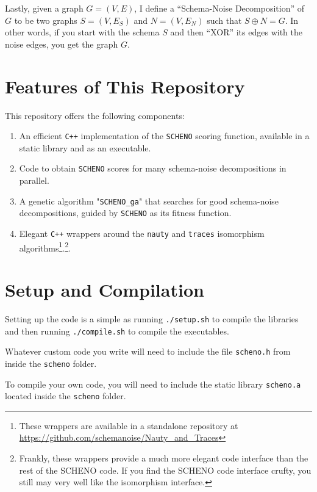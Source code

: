 \documentclass{article}
\begin{document}
Lastly, given a graph $G = (V, E)$, I define a ``Schema-Noise Decomposition'' of $G$ to be two graphs $S = (V, E_S)$ and $N = (V, E_N)$ such that $S \oplus N = G$. In other words, if you start with the schema $S$ and then ``XOR'' its edges with the noise edges, you get the graph $G$.


\section{Features of This Repository}\label{sec:features}

This repository offers the following components:

\begin{enumerate}
    \item An efficient \verb|C++| implementation of the \verb|SCHENO| scoring function, available in a static library and as an executable.
    \item Code to obtain \verb|SCHENO| scores for many schema-noise decompositions in parallel.
    \item A genetic algorithm "\verb|SCHENO_ga|" that searches for good schema-noise decompositions, guided by \verb|SCHENO| as its fitness function.
    \item Elegant \verb|C++| wrappers around the \verb|nauty| and \verb|traces| isomorphism algorithms\footnote{These wrappers are available in a standalone repository at \url{https://github.com/schemanoise/Nauty_and_Traces}}.\footnote{Frankly, these wrappers provide a much more elegant code interface than the rest of the SCHENO code. If you find the SCHENO code interface crufty, you still may very well like the isomorphism interface.}.
\end{enumerate}

\newpage

\section{Setup and Compilation}\label{sec:setup}

Setting up the code is a simple as running \verb|./setup.sh| to compile the libraries and then running \verb|./compile.sh| to compile the executables.

Whatever custom code you write will need to include the file \verb|scheno.h| from inside the \verb|scheno| folder.

To compile your own code, you will need to include the static library \verb|scheno.a| located inside the \verb|scheno| folder.
\end{document}
